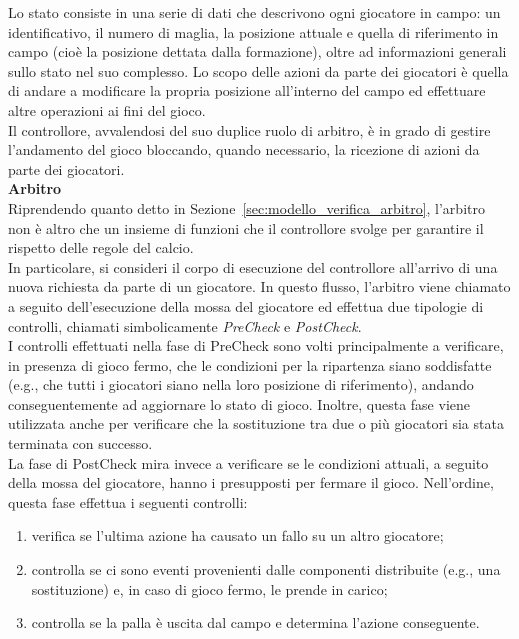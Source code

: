 Lo stato consiste in una serie di dati che descrivono ogni giocatore in campo: un identificativo, il numero di maglia, la posizione attuale e quella di riferimento in campo (cioè la posizione dettata dalla formazione), oltre ad informazioni generali sullo stato nel suo complesso. Lo scopo delle azioni da parte dei giocatori è quella di andare a modificare la propria posizione all'interno del campo ed effettuare altre operazioni ai fini del gioco.\\

Il controllore, avvalendosi del suo duplice ruolo di arbitro, è in grado di gestire l'andamento del gioco bloccando, quando necessario, la ricezione di azioni da parte dei giocatori.\\

\textbf{Arbitro}\\

Riprendendo quanto detto in Sezione~\ref{sec:modello_verifica_arbitro}, l'arbitro non è altro che un insieme di funzioni che il controllore svolge per garantire il rispetto delle regole del calcio.\\

In particolare, si consideri il corpo di esecuzione del controllore all'arrivo di una nuova richiesta da parte di un giocatore. In questo flusso, l'arbitro viene chiamato a seguito dell'esecuzione della mossa del giocatore ed effettua due tipologie di controlli, chiamati simbolicamente \emph{PreCheck} e \emph{PostCheck}.\\

I controlli effettuati nella fase di PreCheck sono volti principalmente a verificare, in presenza di gioco fermo, che le condizioni per la ripartenza siano soddisfatte (e.g., che tutti i giocatori siano nella loro posizione di riferimento), andando conseguentemente ad aggiornare lo stato di gioco. Inoltre, questa fase viene utilizzata anche per verificare che la sostituzione tra due o più giocatori sia stata terminata con successo.\\

La fase di PostCheck mira invece a verificare se le condizioni attuali, a seguito della mossa del giocatore, hanno i presupposti per fermare il gioco. Nell'ordine, questa fase effettua i seguenti controlli:

\begin{enumerate}
	\item verifica se l'ultima azione ha causato un fallo su un altro giocatore;
	\item controlla se ci sono eventi provenienti dalle componenti distribuite (e.g., una sostituzione) e, in caso di gioco fermo, le prende in carico;
	\item controlla se la palla è uscita dal campo e determina l'azione conseguente.
\end{enumerate}

